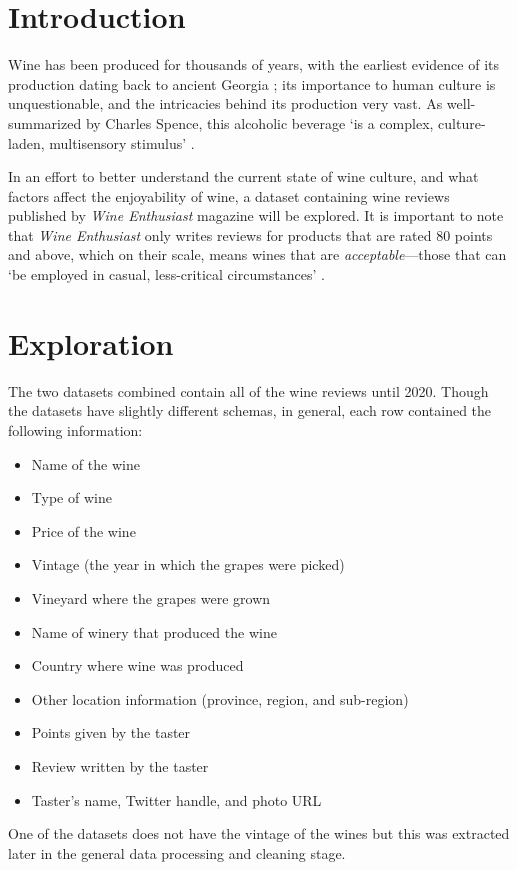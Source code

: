 \section{Introduction}
Wine has been produced for thousands of years, with the earliest evidence of its production dating back to ancient Georgia \cite{McGovernJalabadze2017}; its importance to human culture is unquestionable, and the intricacies behind its production very vast. As well-summarized by Charles Spence, this alcoholic beverage `is a complex, culture-laden, multisensory stimulus' \cite{Spence2020}.

In an effort to better understand the current state of wine culture, and what factors affect the enjoyability of wine, a dataset containing wine reviews published by \emph{Wine Enthusiast} magazine will be explored. It is important to note that \emph{Wine Enthusiast} only writes reviews for products that are rated 80 points and above, which on their scale, means wines that are \emph{acceptable}---those that can `be employed in casual, less-critical circumstances' \cite{WineMag}. %



\section{Exploration}
The two datasets combined contain all of the wine reviews until 2020. Though the datasets have slightly different schemas, in general, each row contained the following information:
\begin{itemize}
    \setlength\itemsep{0.1em}
    \item Name of the wine
    \item Type of wine
    \item Price of the wine
    \item Vintage (the year in which the grapes were picked)
    \item Vineyard where the grapes were grown
    \item Name of winery that produced the wine
    \item Country where wine was produced
    \item Other location information (province, region, and sub-region)
    \item Points given by the taster
    \item Review written by the taster
    \item Taster's name, Twitter handle, and photo URL
\end{itemize}
One of the datasets does not have the vintage of the wines but this was extracted later in the general data processing and cleaning stage.


